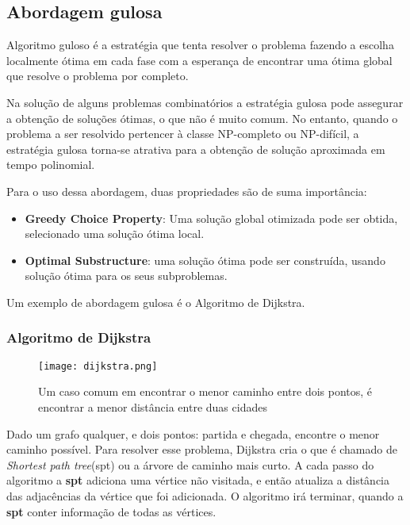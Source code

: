 \subsection{Abordagem gulosa}

    Algoritmo guloso é a estratégia que tenta resolver o problema fazendo a 
    escolha localmente ótima em cada fase com a esperança de encontrar 
    uma ótima global que resolve o problema por completo.

    Na solução de alguns problemas combinatórios a estratégia gulosa pode
    assegurar a obtenção de soluções ótimas, o que não é muito comum. No
    entanto, quando o problema a ser resolvido pertencer à classe NP-completo
    ou NP-difícil, a estratégia gulosa torna-se atrativa para a obtenção de
    solução aproximada em tempo polinomial.

    Para o uso dessa abordagem, duas propriedades são de suma importância: 

    \begin{itemize}
        \item \textbf{Greedy Choice Property}: Uma solução global otimizada pode ser obtida,
        selecionado uma solução ótima local.
        \item \textbf{Optimal Substructure}: uma solução ótima pode ser construída, 
        usando solução ótima para os seus subproblemas.
    \end{itemize}

    Um exemplo de abordagem gulosa é o Algoritmo de Dijkstra.

    \subsubsection{Algoritmo de Dijkstra}

    \begin{figure}[ht]
        \centering
        \texttt{[image: dijkstra.png]}
        \caption{Um caso comum em encontrar o menor caminho entre dois pontos, é encontrar 
        a menor distância entre duas cidades}
        \label{fig:dikstra}
    \end{figure}

    Dado um grafo qualquer, e dois pontos: partida e chegada, encontre o menor caminho possível.
    Para resolver esse problema, Dijkstra cria o que é chamado de \emph{Shortest path tree}(spt) ou 
    a árvore de caminho mais curto. A cada passo do algoritmo a \textbf{spt} adiciona uma vértice não visitada,
    e então atualiza a distância das adjacências da vértice que foi adicionada. O algoritmo irá terminar, quando 
    a \textbf{spt} conter informação de todas as vértices.

